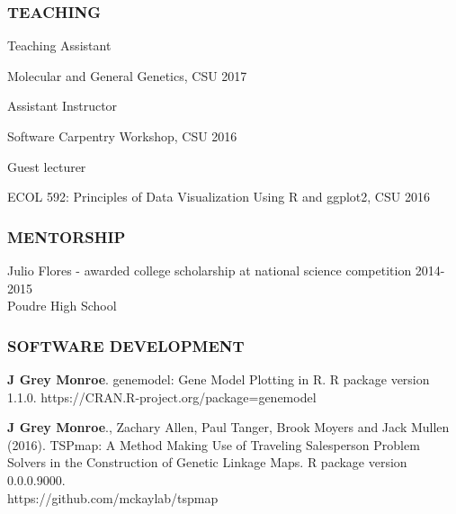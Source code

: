 \documentclass[12pt,english]{article}
\begin{document}

\subsubsection*{TEACHING}
\vspace{-0.5ex}\par
\hspace*{1.0em} Teaching Assistant 
\par
\hspace*{2.0em} Molecular and General Genetics, CSU
\hfill 
2017
\par
\vspace{0.5em}
\hspace*{1.0em} Assistant Instructor
\par
\hspace*{2.0em} Software Carpentry Workshop, CSU
\hfill 
2016
\par
\vspace{0.5em}
\hspace*{1.0em} Guest lecturer
\par
\hspace*{2.0em} ECOL 592: Principles of Data Visualization Using R and ggplot2, CSU
\hfill 
2016
\vspace{0.5em}\par


\subsubsection*{MENTORSHIP}
\vspace{-0.5ex}\par

\hspace*{1.0em} Julio Flores - awarded college scholarship at national science competition 
\hfill 
2014-2015\\
\hspace*{2.0em} Poudre High School


\subsubsection*{SOFTWARE DEVELOPMENT}
\vspace{-0.5ex}

\begin{hangparas}{.5in}{1}

\hspace{1em}\textbf{J Grey Monroe}. genemodel: Gene Model Plotting in R. R package version 1.1.0.
  https://CRAN.R-project.org/package=genemodel
\vspace{0.5ex}\par
\hspace{1em}\textbf{J Grey Monroe}., Zachary Allen, Paul Tanger, Brook Moyers and Jack Mullen (2016). TSPmap: A Method Making Use of Traveling Salesperson Problem Solvers in the Construction of Genetic Linkage Maps. R package version 0.0.0.9000. \\https://github.com/mckaylab/tspmap

\end{hangparas}
\end{document}
